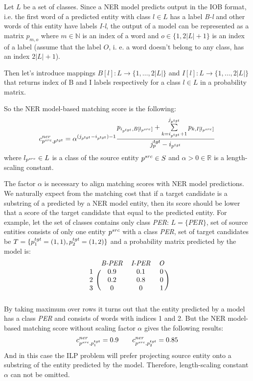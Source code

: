 Let \( L \) be a set of classes. Since a NER model predicts output in the IOB format, i.e. the first word of a predicted
entity with class \( l \in L \) has a label \textit{B-l} and other words of this entity have labels \textit{I-l},
the output of a model can be represented as a matrix \( p_{m, o} \) where \( m \in \mathbb{N} \) is an index of a word and
\( o \in \{ 1, 2|L| + 1 \} \) is an index of a label (assume that the label \( O \), i. e. a word doesn't belong to any class,
has an index \( 2|L| + 1 \)).

Then let's introduce mappings \( B[l]: L \rightarrow \{ 1, \dots, 2|L| \} \) and
\( I[l]: L \rightarrow \{ 1, \dots, 2|L| \} \) that returns index of B and I labels respectively
for a class \( l \in L \) in a probability matrix.

So the NER model-based matching score is the following:
\begin{equation} \label{eq:ner_cost}
  c_{p^{src}, p^{tgt}}^{ner} = \alpha^{(j_{p^{tgt}} - i_{p^{tgt}}) - 1}
  \frac{
    p_{i_{p^{tgt}}, B[l_{p^{src}}]} +
    \sum\limits_{k = i_{p^{tgt}} + 1}^{j_{p^{tgt}}} p_{k, I[l_{p^{src}}]}
  }
  {j_p^{tgt} - i_{p^{tgt}}}
\end{equation}
where \( l_{p^{src}} \in L \) is a class of the source entity \( p^{src} \in S \) and
\( \alpha > 0 \in \mathbb{R} \) is a length-scaling constant.

The factor \( \alpha \) is necessary to align matching scores with NER model predictions.
We naturally expect from the matching cost that if a target candidate is a substring of a predicted
by a NER model entity, then its score should be lower that a score of the target candidate that
equal to the predicted entity. For example, let the set of classes contains only class \textit{PER}: \( L = \{ PER \}\),
set of source entities consists of only one entity \( p^{src} \) with a class \textit{PER},
set of target candidates be \( T =  \{ p_1^{tgt} = (1, 1), p_2^{tgt} = (1, 2) \} \) and a probability matrix predicted by the model is:
\[
  \begin{blockarray}{cccc}
    & \text{\textit{B-PER}} & \text{\textit{I-PER}} & \text{\textit{O}} \\
    \begin{block}{c(ccc)}
      1 & 0.9 & 0.1 & 0 \\
      2 & 0.2 & 0.8 & 0 \\
      3 & 0   & 0   & 1 \\
    \end{block}
  \end{blockarray}
\]
By taking maximum over rows it turns out that the entity predicted by a model has a class \textit{PER} and
consists of words with indices 1 and 2. But the NER model-based matching score without scaling factor
\( \alpha \) gives the following results:
\[
  c_{p^{src}, p_1^{tgt}}^{ner} = 0.9 \qquad c_{p^{src}, p_2^{tgt}}^{ner} = 0.85
\]
And in this case the ILP problem will prefer projecting source entity onto a substring of the entity predicted
by the model. Therefore, length-scaling constant \( \alpha \) can not be omitted.

